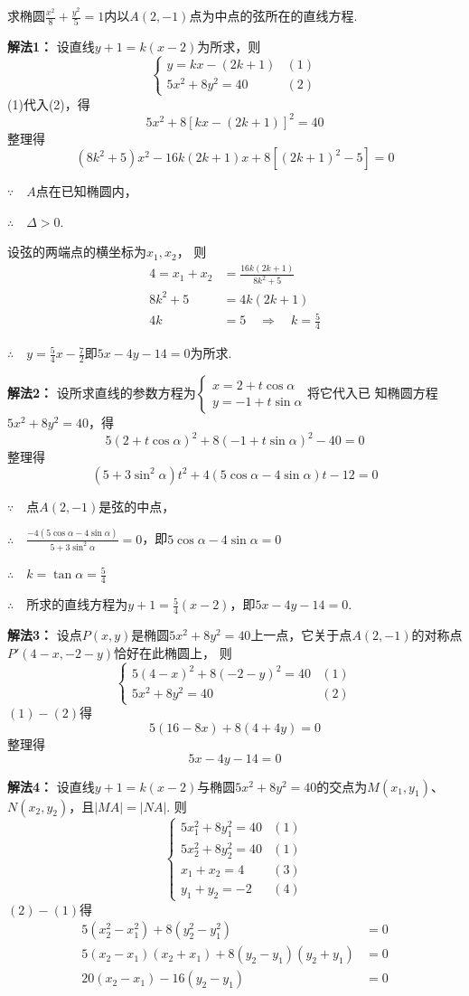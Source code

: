 \begin{example}
    求椭圆$\frac{x^2}{8}+\frac{y^2}{5}=1$内以$A(2,-1)$点为中点的弦所在的直线方程.
\end{example}

\begin{solution}
\textbf{解法1：}
设直线$y+1=k(x-2)$为所求，则
\[\begin{cases}
    y=kx-(2k+1)&(1)\\
    5x^2+8y^2=40&(2)
\end{cases}\]
(1)代入(2)，得
\[5x^2+8[kx-(2k+1)]^2=40\]
整理得
\[(8k^2+5)x^2-16k(2k+1)x+8[(2k+1)^2-5]=0\]

$\because\quad A$点在已知椭圆内，

$\therefore\quad \Delta>0$.

设弦的两端点的横坐标为$x_1,x_2$，
则
\[ \begin{split}
    4=x_1+x_2&=\frac{16k(2k+1)}{8k^2+5}\\
8k^2+5&=4k(2k+1)\\
4k&=5 \quad\Rightarrow \quad k=\frac{5}{4}
\end{split} \]

$\therefore\quad y=\frac{5}{4}x-\frac{7}{2}$即$5x-4y-14=0$为所求.

\textbf{解法2：}
设所求直线的参数方程为$\begin{cases}
    x=2+t\cos\alpha\\ y=-1+t\sin\alpha
\end{cases}$将它代入已
知椭圆方程$5x^2+8y^2=40$，得
\[5(2+t\cos\alpha)^2+8(-1+t\sin\alpha)^2-40=0\]
整理得
\[(5+3\sin^2\alpha)t^2+4(5\cos\alpha-4\sin\alpha)t-12=0\]

$\because\quad $点$A(2,-1)$是弦的中点，

$\therefore\quad \frac{-4(5\cos\alpha-4\sin\alpha)}{5+3\sin^2\alpha}=0$，即$5\cos\alpha-4\sin\alpha=0$

$\therefore\quad k=\tan\alpha=\frac{5}{4}$

$\therefore\quad $所求的直线方程为$y+1=\frac{5}{4}(x-2)$，即$5x-4y-14=0$.

\textbf{解法3：}
设点$P(x,y)$是椭圆$5x^2+8y^2=40$上一点，它关于点$A(2,-1)$的对称点$P'(4-x,-2-y)$恰好在此椭圆上，
则
\[\begin{cases}
    5(4-x)^2+8(-2-y)^2=40 & (1)\\
    5x^2+8y^2=40&(2)
\end{cases}\]
$(1)-(2)$得
\[5(16-8x)+8(4+4y)=0\]
整理得
\[5x-4y-14=0\]

\textbf{解法4：}
设直线$y+1=k(x-2)$与椭圆$5x^2+8y^2=40$的交点为$M(x_1,y_1)$、$N(x_2,y_2)$，且$|MA|=|NA|$. 则
\[\begin{cases}
    5x_1^2+8y^2_1=40&(1)\\
    5x^2_2+8y^2_2=40&(1)\\
    x_1+x_2=4&(3)\\
    y_1+y_2=-2&(4)
\end{cases}\]
$(2)-(1)$得
\[\begin{split}
   5(x_2^2-x_1^2)+8(y_2^2-y_1^2)&=0\\
5(x_2-x_1)(x_2+x_1)+8(y_2-y_1)(y_2+y_1)&=0\\
20(x_2-x_1)-16(y_2-y_1)&=0 
\end{split}\]


\end{solution}
